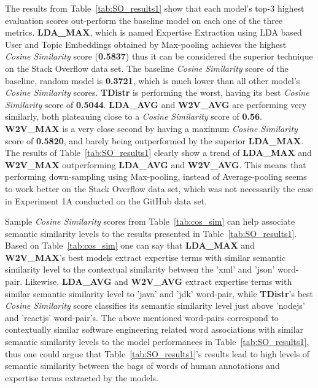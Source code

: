         The results from Table~\ref{tab:SO_results1} show that each model's top-$3$ highest evaluation scores out-perform the baseline model on each one of the three metrics. \textbf{LDA\_MAX}, which is named Expertise Extraction using LDA based User and Topic Embeddings obtained by Max-pooling achieves the highest \emph{Cosine Similarity} score (\textbf{0.5837}) thus it can be considered the superior technique on the Stack Overflow data set. The baseline \emph{Cosine Similarity} score of the baseline, random model is \textbf{0.3721}, which is much lower than all other model's \emph{Cosine Similarity} scores. \textbf{TDistr} is performing the worst, having its best \emph{Cosine Similarity} score of \textbf{0.5044}. \textbf{LDA\_AVG} and \textbf{W2V\_AVG} are performing very similarly, both plateauing close to a \emph{Cosine Similarity} score of \textbf{0.56}. \textbf{W2V\_MAX} is a very close second by having a maximum \emph{Cosine Similarity} score of \textbf{0.5820}, and barely being outperformed by the superior \textbf{LDA\_MAX}. The results of Table~\ref{tab:SO_results1} clearly show a trend of \textbf{LDA\_MAX} and \textbf{W2V\_MAX} outperforming \textbf{LDA\_AVG} and \textbf{W2V\_AVG}. This means that performing down-sampling using Max-pooling, instead of Average-pooling seems to work better on the Stack Overflow data set, which was not necessarily the case in Experiment 1A conducted on the GitHub data set.
        
        Sample \emph{Cosine Similarity} scores from Table~\ref{tab:cos_sim} can help associate semantic similarity levels to the results presented in Table~\ref{tab:SO_results1}. Based on Table~\ref{tab:cos_sim} one can say that  \textbf{LDA\_MAX} and \textbf{W2V\_MAX}'s best models extract expertise terms with similar semantic similarity level to the contextual similarity between the 'xml' and 'json' word-pair. Likewise, \textbf{LDA\_AVG} and \textbf{W2V\_AVG} extract expertise terms with similar semantic similarity level to 'java' and 'jdk' word-pair, while \textbf{TDistr}'s best \emph{Cosine Similarity} score classifies its semantic similarity level just above 'nodejs' and 'reactjs' word-pair's. The above mentioned word-pairs correspond to contextually similar software engineering related word associations with similar semantic similarity levels to the model performances in Table~\ref{tab:SO_results1}, thus one could argue that Table~\ref{tab:SO_results1}'s results lead to high levels of semantic similarity between the bags of words of human annotations and expertise terms extracted by the models.
        
